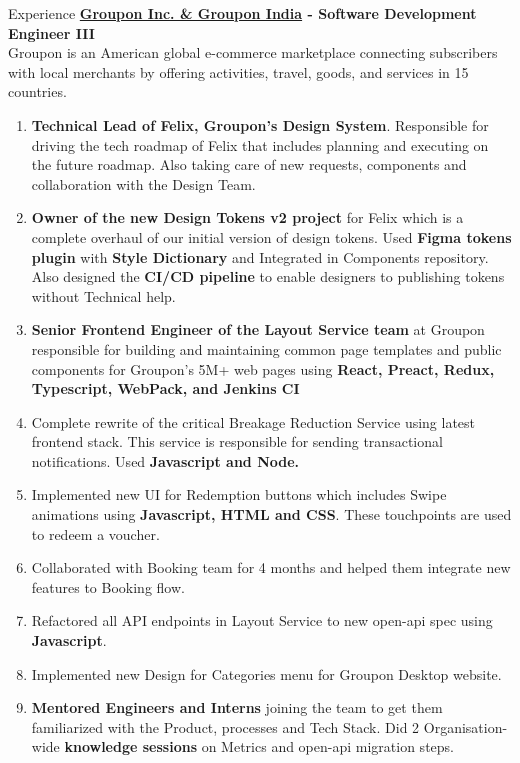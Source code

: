 \documentclass{resume} %
\begin{document}
\begin{rSection}{Experience}
{\bf \href{http://groupon.com}{Groupon Inc. \& Groupon India} -  Software Development Engineer III \hfill{}}
\\Groupon is an American global e-commerce marketplace connecting subscribers with local merchants by offering activities, travel, goods, and services in 15 countries.
 \begin{enumerate}
        \item \textbf{Technical Lead of {Felix, Groupon's Design System}}. Responsible for driving the tech roadmap of Felix that includes planning and executing on the future roadmap. Also taking care of new requests, components and collaboration with the Design Team.
        \item \textbf{Owner of the new Design Tokens v2 project} for Felix which is a complete overhaul of our initial version of design tokens. Used \textbf{Figma tokens plugin }with \textbf{Style Dictionary} and Integrated in Components repository. Also designed the \textbf{CI/CD pipeline} to enable designers to publishing tokens without Technical help.
		\item \textbf{Senior Frontend Engineer of the Layout Service team} at Groupon responsible for building and maintaining common page templates and public components for Groupon’s 5M+ web pages using \textbf{React, Preact, Redux, Typescript, WebPack, and Jenkins CI}
        \item Complete rewrite of the critical Breakage Reduction Service using latest frontend stack. This service is responsible for sending transactional notifications. Used \textbf{Javascript and Node.}
        \item Implemented new UI for Redemption buttons which includes Swipe animations using \textbf{Javascript, HTML and CSS}. These touchpoints are used to redeem a voucher.
        \item Collaborated with Booking team for 4 months and helped them integrate new features to Booking flow.
        \item Refactored all API endpoints in Layout Service to new open-api spec using \textbf{Javascript}.
        \item Implemented new Design for Categories menu for Groupon Desktop website.
    \item \textbf{Mentored Engineers and Interns} joining the team to get them familiarized with the Product, processes and Tech Stack. Did 2 Organisation-wide \textbf{knowledge sessions} on Metrics and open-api migration steps.
   \end{enumerate}


\end{rSection}
\end{document}
